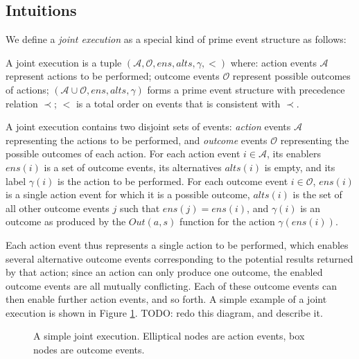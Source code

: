 \subsection{Intuitions}

We define a \emph{joint execution} as a special kind of prime event
structure as follows:

\begin{defnL}
 A joint execution is a tuple $(\mathcal{A},\mathcal{O},ens,alts,\gamma,<)$
where: action events $\mathcal{A}$ represent actions to be performed;
outcome events $\mathcal{O}$ represent possible outcomes of actions;
$(\mathcal{A}\cup\mathcal{O},ens,alts,\gamma)$ forms a prime event
structure with precedence relation $\prec$; $<$ is a total order
on events that is consistent with $\prec$. 
\end{defnL}
A joint execution contains two disjoint sets of events: \emph{action}
events $\mathcal{A}$ representing the actions to be performed, and
\emph{outcome} events $\mathcal{O}$ representing the possible outcomes
of each action. For each action event $i\in\mathcal{A}$, its enablers
$ens(i)$ is a set of outcome events, its alternatives $alts(i)$
is empty, and its label $\gamma(i)$ is the action to be performed.
For each outcome event $i\in\mathcal{O}$, $ens(i)$ is a single action
event for which it is a possible outcome, $alts(i)$ is the set of
all other outcome events $j$ such that $ens(j)=ens(i)$, and $\gamma(i)$
is an outcome as produced by the $Out(a,s)$ function for the action
$\gamma(ens(i))$.

Each action event thus represents a single action to be performed,
which enables several alternative outcome events corresponding to
the potential results returned by that action; since an action can
only produce one outcome, the enabled outcome events are all mutually
conflicting. Each of these outcome events can then enable further
action events, and so forth. A simple example of a joint execution
is shown in Figure \ref{fig:example-je}. TODO: redo this diagram,
and describe it.

%
\begin{figure}

\caption{ A simple joint execution. Elliptical nodes are action events, box
nodes are outcome events. }


\label{fig:example-je} 
\end{figure}


